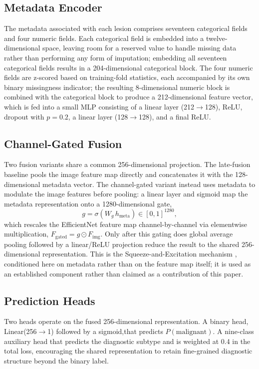\documentclass[conference]{IEEEtran}
\begin{document}
\subsection{Metadata Encoder}
\label{sec:metadata_encoder}
The metadata associated with each lesion comprises seventeen categorical fields and four numeric fields. Each categorical field is embedded into a twelve-dimensional space, leaving room for a reserved value to handle missing data rather than performing any form of imputation; embedding all seventeen categorical fields results in a 204-dimensional categorical block. The four numeric fields are z-scored based on training-fold statistics, each accompanied by its own binary missingness indicator; the resulting 8-dimensional numeric block is combined with the categorical block to produce a 212-dimensional feature vector, which is fed into a small MLP consisting of a linear layer (212$\to$128), ReLU, dropout with $p=0.2$, a linear layer (128$\to$128), and a final ReLU.

\subsection{Channel-Gated Fusion}
\label{sec:fusion}
Two fusion variants share a common 256-dimensional projection. The late-fusion baseline pools the image feature map directly and concatenates it with the 128-dimensional metadata vector. The channel-gated variant instead uses metadata to modulate the image features before pooling: a linear layer and sigmoid map the metadata representation onto a 1280-dimensional gate,
\begin{equation}
g = \sigma(W_g\, h_{\mathrm{meta}}) \in [0,1]^{1280},
\end{equation}
which rescales the EfficientNet feature map channel-by-channel via elementwise multiplication, $F_{\mathrm{gated}} = g \odot F_{\mathrm{img}}$. Only after this gating does global average pooling followed by a linear/ReLU projection reduce the result to the shared 256-dimensional representation. This is the Squeeze-and-Excitation mechanism \cite{se}, conditioned here on metadata rather than on the feature map itself; it is used as an established component rather than claimed as a contribution of this paper.

\subsection{Prediction Heads}
\label{sec:heads}
Two heads operate on the fused 256-dimensional representation. A binary head, Linear(256$\to$1) followed by a sigmoid,that  predicts $P(\text{malignant})$. A nine-class auxiliary head that predicts the diagnostic subtype and is weighted at 0.4 in the total loss, encouraging the shared representation to retain fine-grained diagnostic structure beyond the binary label.
\end{document}
